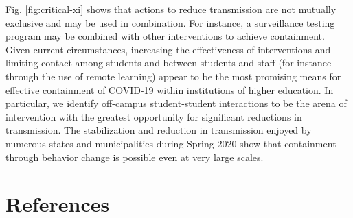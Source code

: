\documentclass[
]{article}
\begin{document}
Fig. \ref{fig:critical-xi} shows that actions to reduce transmission are
not mutually exclusive and may be used in combination. For instance, a
surveillance testing program may be combined with other interventions to
achieve containment. Given current circumstances, increasing the
effectiveness of interventions and limiting contact among students and
between students and staff (for instance through the use of remote
learning) appear to be the most promising means for effective
containment of COVID-19 within institutions of higher education. In
particular, we identify off-campus student-student interactions to be
the arena of intervention with the greatest opportunity for significant
reductions in transmission. The stabilization and reduction in
transmission enjoyed by numerous states and municipalities during Spring
2020 show that containment through behavior change is possible even at
very large scales.

\hypertarget{references}{%
\section*{References}\label{references}}
\end{document}
